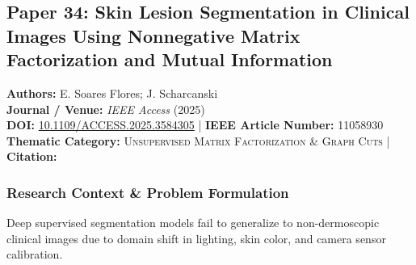\subsection{Paper 34: Skin Lesion Segmentation in Clinical Images Using Nonnegative Matrix Factorization and Mutual Information}
\label{sec:paper_34}

\begin{tcolorbox}[colback=gray!5!white,colframe=gray!75!black,title=\textbf{Metadata \& Citation Summary}]
\textbf{Authors:} E. Soares Flores; J. Scharcanski \\
\textbf{Journal / Venue:} \textit{IEEE Access} (2025) \\
\textbf{DOI:} \href{https://doi.org/10.1109/ACCESS.2025.3584305}{10.1109/ACCESS.2025.3584305} \quad | \quad \textbf{IEEE Article Number:} 11058930 \\
\textbf{Thematic Category:} \textsc{Unsupervised Matrix Factorization \& Graph Cuts} \quad | \quad \textbf{Citation:} \cite{11058930}
\end{tcolorbox}

\subsubsection*{Research Context \& Problem Formulation}
Deep supervised segmentation models fail to generalize to non-dermoscopic clinical images due to domain shift in lighting, skin color, and camera sensor calibration.

